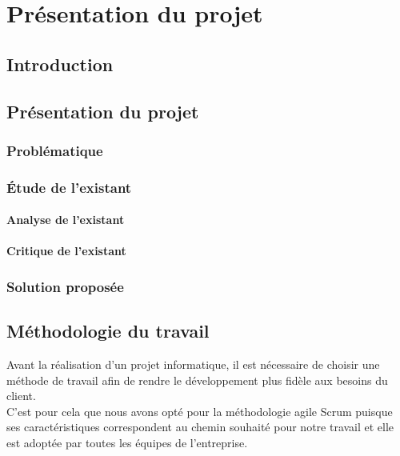 \chapter{Présentation du projet}
\label{chap:premierchapitre}

\section{Introduction}




\raggedbottom

\section{Présentation du projet}




\subsection{Problématique}



\subsection{Étude de l’existant}
\vspace{8mm}
\subsubsection{Analyse de l’existant}



\subsubsection{Critique de l’existant}
\vspace{8mm}
\subsection{Solution proposée}
\vspace{4mm}



\vspace{5mm}
\section{Méthodologie du travail}
\vspace{5mm}
Avant la réalisation d’un projet informatique, il est nécessaire de choisir une méthode de
travail afin de rendre le développement plus fidèle aux besoins du client. \\ C’est pour cela que nous avons opté pour la méthodologie agile Scrum puisque ses caractéristiques correspondent au chemin souhaité pour notre travail et elle est adoptée par toutes les équipes de l’entreprise.

